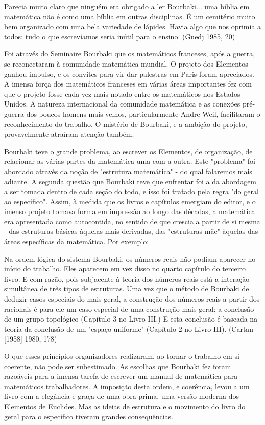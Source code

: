 \documentclass[a4paper,12pt]{article}[abntex2]
\begin{document}
Parecia muito claro que ninguém era obrigado a ler Bourbaki... uma bíblia em matemática não é como uma bíblia em outras disciplinas. É um cemitério muito bem organizado com uma bela variedade de lápides.  Havia algo que nos oprimia a todos: tudo o que escrevíamos seria inútil para o ensino. (Guedj 1985, 20)

Foi através do Seminaire Bourbaki que os matemáticos franceses, após a guerra, se reconectaram à comunidade matemática mundial. O projeto dos Elementos ganhou impulso, e os convites para vir dar palestras em Paris foram apreciados. A imensa força dos matemáticos franceses em várias áreas importantes fez com que o projeto fosse cada vez mais notado entre os matemáticos nos Estados Unidos. A natureza internacional da comunidade matemática e as conexões pré-guerra dos poucos homens mais velhos, particularmente Andre Weil, facilitaram o reconhecimento do trabalho. O mistério de Bourbaki, e a ambição do projeto, provavelmente atraíram atenção também.

Bourbaki teve o grande problema, ao escrever os Elementos, de organização, de relacionar as várias partes da matemática uma com a outra. Este "problema" foi abordado através da noção de "estrutura matemática" - do qual falaremos mais adiante. A segunda questão que Bourbaki teve que enfrentar foi a da abordagem a ser tomada dentro de cada seção do todo, e isso foi tratado pela regra "do geral ao específico". Assim, à medida que os livros e capítulos emergiam do editor, e o imenso projeto tomava forma em impressão ao longo das décadas, a matemática era apresentada como autocontida, no sentido de que crescia a partir de si mesma - das estruturas básicas àquelas mais derivadas, das "estruturas-mãe" àquelas das áreas específicas da matemática. Por exemplo:

Na ordem lógica do sistema Bourbaki, os números reais não podiam aparecer no início do trabalho. Eles aparecem em vez disso no quarto capítulo do terceiro livro. E com razão, pois subjacente à teoria dos números reais está a interação simultânea de três tipos de estruturas. Uma vez que o método de Bourbaki de deduzir casos especiais do mais geral, a construção dos números reais a partir dos racionais é para ele um caso especial de uma construção mais geral: a conclusão de um grupo topológico (Capítulo 3 no Livro III.) E esta conclusão é baseada na teoria da conclusão de um "espaço uniforme" (Capítulo 2 no Livro III). (Cartan [1958] 1980, 178)

O que esses princípios organizadores realizaram, ao tornar o trabalho em si coerente, não pode ser subestimado. As escolhas que Bourbaki fez foram razoáveis para a imensa tarefa de escrever um manual de matemática para matemáticos trabalhadores. A imposição desta ordem, e coerência, levou a um livro com a elegância e graça de uma obra-prima, uma versão moderna dos Elementos de Euclides. Mas as ideias de estrutura e o movimento do livro do geral para o específico tiveram grandes consequências.
\end{document}
